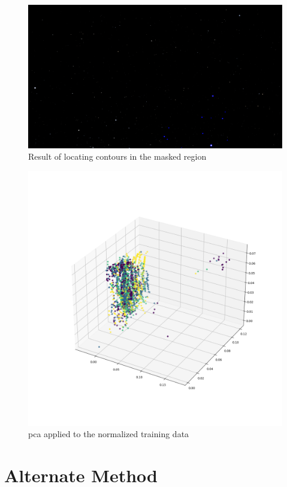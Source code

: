 \documentclass[10pt,twocolumn,letterpaper]{article}
\begin{document}
\begin{figure}[H]
  \centering
   \includegraphics[width=0.9\linewidth]{local_contours}
   \caption{Result of locating contours in the masked region}
   \label{fig:star_local_contours}
\end{figure}

\begin{figure}[H]
  \centering
   \includegraphics[width=0.9\linewidth, trim={14em, 12em, 9em, 15em}, clip]{pca}
   \caption{\acrshort{pca} applied to the normalized training data}
   \label{fig:pca}
\end{figure}

\section{Alternate Method}
\label{sec:alt_method}
\end{document}
